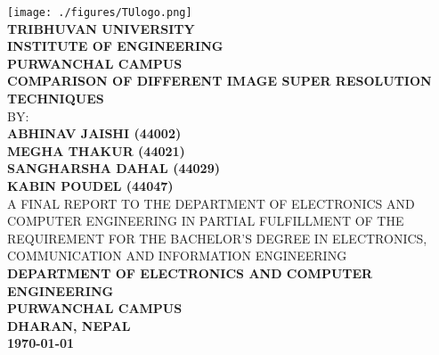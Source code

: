 \thispagestyle{empty} %



{
	\thispagestyle{empty}
	\centering
	\normalsize
	  
	\texttt{[image: ./figures/TUlogo.png]}\\[0.5cm]
	{\bf{TRIBHUVAN UNIVERSITY}\\
	{INSTITUTE OF ENGINEERING}\\
	PURWANCHAL CAMPUS}
	\\[1cm]
	
	{\bf COMPARISON OF DIFFERENT IMAGE SUPER RESOLUTION TECHNIQUES}\\[1cm]
	
	BY:\\
	{\bf ABHINAV JAISHI \hspace{1in} (44002)}\\
	{\bf MEGHA THAKUR    \hspace{1in} (44021)}\\
	{\bf SANGHARSHA DAHAL \hspace{0.6in} (44029)}\\
	{\bf KABIN POUDEL     \hspace{1in}\space\space\space\space (44047)}\\[1.5cm]

	



	A FINAL REPORT TO THE DEPARTMENT OF ELECTRONICS AND COMPUTER
	ENGINEERING IN PARTIAL FULFILLMENT OF THE REQUIREMENT FOR THE BACHELOR'S
	DEGREE IN ELECTRONICS, COMMUNICATION AND INFORMATION ENGINEERING\\[0.5cm]
	
	{\bf DEPARTMENT OF ELECTRONICS AND COMPUTER ENGINEERING\\
	PURWANCHAL CAMPUS\\
	DHARAN, NEPAL}\\[1.5cm]
	
	{\bf\today}
	
	
}

